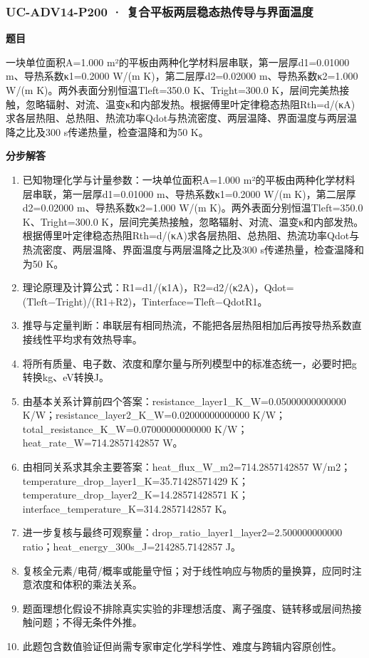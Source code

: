 \documentclass[UTF8,11pt,a4paper]{ctexart}
\begin{document}
\subsubsection*{UC-ADV14-P200 · 复合平板两层稳态热传导与界面温度}
\noindent\textbf{题目}\par
一块单位面积A=1.000 m²的平板由两种化学材料层串联，第一层厚d1=0.01000 m、导热系数κ1=0.2000 W/(m K)，第二层厚d2=0.02000 m、导热系数κ2=1.000 W/(m K)。两外表面分别恒温Tleft=350.0 K、Tright=300.0 K，层间完美热接触，忽略辐射、对流、温变κ和内部发热。根据傅里叶定律稳态热阻Rth=d/(κA)求各层热阻、总热阻、热流功率Qdot与热流密度、两层温降、界面温度与两层温降之比及300 s传递热量，检查温降和为50 K。\par
\medskip\noindent\textbf{分步解答}
\begin{enumerate}
\item 已知物理化学与计量参数：一块单位面积A=1.000 m²的平板由两种化学材料层串联，第一层厚d1=0.01000 m、导热系数κ1=0.2000 W/(m K)，第二层厚d2=0.02000 m、导热系数κ2=1.000 W/(m K)。两外表面分别恒温Tleft=350.0 K、Tright=300.0 K，层间完美热接触，忽略辐射、对流、温变κ和内部发热。根据傅里叶定律稳态热阻Rth=d/(κA)求各层热阻、总热阻、热流功率Qdot与热流密度、两层温降、界面温度与两层温降之比及300 s传递热量，检查温降和为50 K。
\item 理论原理及计算公式：R1=d1/(κ1A)，R2=d2/(κ2A)，Qdot=(Tleft−Tright)/(R1+R2)，Tinterface=Tleft−QdotR1。
\item 推导与定量判断：串联层有相同热流，不能把各层热阻相加后再按导热系数直接线性平均求有效热导率。
\item 将所有质量、电子数、浓度和摩尔量与所列模型中的标准态统一，必要时把g转换kg、eV转换J。
\item 由基本关系计算前四个答案：resistance\_layer1\_K\_W=0.05000000000000 K/W；resistance\_layer2\_K\_W=0.02000000000000 K/W；total\_resistance\_K\_W=0.07000000000000 K/W；heat\_rate\_W=714.2857142857 W。
\item 由相同关系求其余主要答案：heat\_flux\_W\_m2=714.2857142857 W/m2；temperature\_drop\_layer1\_K=35.71428571429 K；temperature\_drop\_layer2\_K=14.28571428571 K；interface\_temperature\_K=314.2857142857 K。
\item 进一步复核与最终可观察量：drop\_ratio\_layer1\_layer2=2.500000000000 ratio；heat\_energy\_300s\_J=214285.7142857 J。
\item 复核全元素/电荷/概率或能量守恒；对于线性响应与物质的量换算，应同时注意浓度和体积的乘法关系。
\item 题面理想化假设不排除真实实验的非理想活度、离子强度、链转移或层间热接触问题；不得无条件外推。
\item 此题包含数值验证但尚需专家审定化学科学性、难度与跨辑内容原创性。
\end{enumerate}
\end{document}
